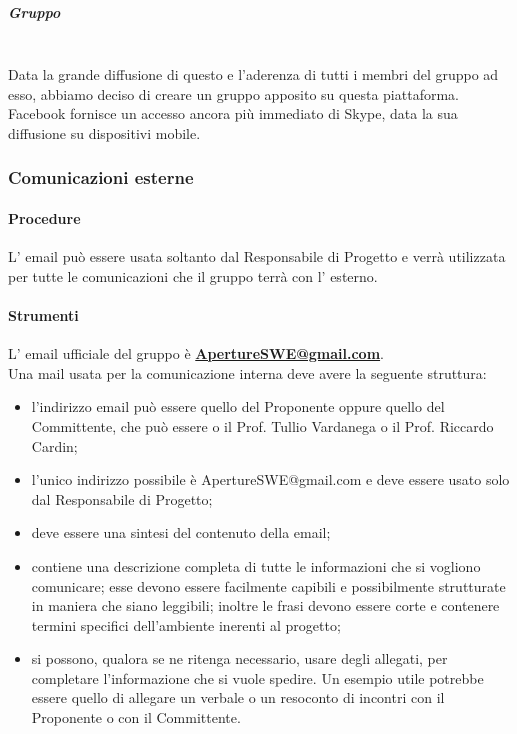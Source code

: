 \subparagraph{Gruppo } \hfill \\
Data la grande diffusione di questo  e l'aderenza di tutti i membri del gruppo ad esso, abbiamo deciso di creare un gruppo apposito su questa piattaforma. Facebook fornisce un accesso ancora più immediato di Skype, data la sua diffusione su dispositivi mobile.


\subsubsection{Comunicazioni esterne}
\paragraph{Procedure}
L' email può essere usata soltanto dal Responsabile di Progetto e verrà utilizzata per tutte le comunicazioni che il gruppo terrà con l' esterno.
\paragraph{Strumenti}
L' email ufficiale del gruppo è \textbf{\url{ApertureSWE@gmail.com}}.\\
Una mail usata per la comunicazione interna deve avere la seguente struttura:
\begin{itemize}
\item {} l'indirizzo email può essere quello del Proponente oppure quello del Committente, che può essere o il Prof. Tullio Vardanega o il Prof. Riccardo Cardin;
\item {} l'unico indirizzo possibile è ApertureSWE@gmail.com e deve essere usato solo dal Responsabile di Progetto;
\item {} deve essere una sintesi del contenuto della email;
\item {} contiene una descrizione completa di tutte le informazioni che si vogliono comunicare; esse devono essere facilmente capibili e possibilmente strutturate in maniera che siano leggibili; inoltre le frasi devono essere corte e contenere termini specifici dell'ambiente  inerenti al progetto;
\item {} si possono, qualora se ne ritenga necessario, usare degli allegati, per completare l'informazione che si vuole spedire. Un esempio utile potrebbe essere quello di allegare un verbale o un resoconto di incontri con il Proponente  o con il Committente.
\end{itemize}

